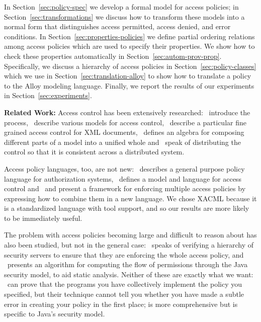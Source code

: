 In Section~\ref{sec:policy-spec} we develop a formal model for access
policies; in Section~\ref{sec:transformations} we discuss how to
transform these models into a normal form that distinguishes access
permitted, access denied, and error conditions.  In
Section~\ref{sec:properties-policies} we define partial ordering
relations among access policies which are used to specify their
properties.  We show how to check these properties automatically in
Section~\ref{sec:autom-prov-prop}.  Specifically, we discuss a
hierarchy of access policies in Section~\ref{sec:policy-classes} which
we use in Section~\ref{sec:translation-alloy} to show how to translate
a policy to the Alloy modeling language.  Finally, we report the
results of our experiments in Section~\ref{sec:experiments}.

{\bf Related Work:}
Access control has been extensively researched:
\cite{samarati01policiesmodelsmechanisms,sandhu94access,sandhu96audit}~introduce
the process,
\cite{bertino98access,bonatti01dataarchives,sandhu93latticebased,sandhu96rolebased}~describe
various models for access control,
\cite{damiani02SVG,damiani01controllingaccess,damiani02fine,damiani00design}~describe
a particular fine grained access control for XML documents,
\cite{bonatti02algebra}~defines an algebra for composing different
parts of a model into a unified whole and
\cite{abadi93calculus,heckman98applying,divimercati96federated}~speak
of distributing the control so that it is consistent across a
distributed system.

Access policy languages, too, are not new:
\cite{abadpeiro99plas}~describes a general purpose policy language for
authorization systems, \cite{jajodialogical}~defines a model and
language for access control and \cite{jajodia01multiplepolicies}~and
\cite{jajoida97unified} present a framework for enforcing multiple
access policies by expressing how to combine them in a new language.
We chose XACML because it is a standardized language with tool
support, and so our results are more likely to be immediately useful.

The problem with access policies becoming large and difficult to
reason about has also been studied, but not in the general case:
\cite{heckman98applying}~speaks of verifying a hierarchy of security
servers to ensure that they are enforcing the whole access policy,
and \cite{naumovich:permission-analysis}~presents an algorithm for
computing the flow of permissions through the Java security model, to
aid static analysis.  Neither of these are exactly what we want:
\cite{heckman98applying}~can prove that the programs you have
collectively implement the policy you specified, but their technique
cannot tell you whether you have made a subtle error in creating your
policy in the first place; \cite{naumovich:permission-analysis} is
more comprehensive but is specific to Java's security model.

